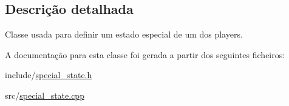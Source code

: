 \subsection{Descrição detalhada}
Classe usada para definir um estado especial de um dos players. 

A documentação para esta classe foi gerada a partir dos seguintes ficheiros\+:\begin{DoxyCompactItemize}
\item 
include/\mbox{\hyperlink{special__state_8h}{special\+\_\+state.\+h}}\item 
src/\mbox{\hyperlink{special__state_8cpp}{special\+\_\+state.\+cpp}}\end{DoxyCompactItemize}
